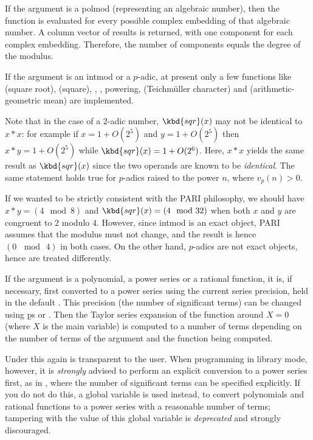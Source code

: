 \item If the argument is a polmod (representing an algebraic number),
then the function is evaluated for every possible complex embedding of that
algebraic number.  A column vector of results is returned, with one component
for each complex embedding.  Therefore, the number of components equals
the degree of the  modulus.

\item If the argument is an intmod or a $p$-adic, at present only a
few functions like  (square root),  (square), ,
, powering,  (Teichm\"uller character) and
 (arithmetic-geometric mean) are implemented.

Note that in the case of a $2$-adic number, $\kbd{sqr}(x)$ may not be
identical to $x*x$: for example if $x = 1+O(2^5)$ and $y = 1+O(2^5)$ then
$x*y = 1+O(2^5)$ while $\kbd{sqr}(x) = 1+O(2^6)$. Here, $x * x$ yields the
same result as $\kbd{sqr}(x)$ since the two operands are known to be
\emph{identical}. The same statement holds true for $p$-adics raised to the
power $n$, where $v_p(n) > 0$.

 If we wanted to be strictly consistent with
the PARI philosophy, we should have $x*y = (4 \mod 8)$ and $\kbd{sqr}(x) =
(4 \mod 32)$ when both $x$ and $y$ are congruent to $2$ modulo $4$.
However, since intmod is an exact object, PARI assumes that the modulus
must not change, and the result is hence $(0\, \mod\, 4)$ in both cases. On
the other hand, $p$-adics are not exact objects, hence are treated
differently.

\item If the argument is a polynomial, a power series or a rational function,
it is, if necessary, first converted to a power series using the current
series precision, held in the default . This precision
(the number of significant terms) can be changed using \b{ps} or
. Then the Taylor series expansion of the
function around $X=0$ (where $X$ is the main variable) is computed to a
number of terms depending on the number of terms of the argument and the
function being computed.

Under  this again is transparent to the user. When programming in
library mode, however, it is \emph{strongly} advised to perform an explicit
conversion to a power series first, as in ,
where the number of significant terms  can be specified
explicitly. If you do not do this, a global variable  is used
instead, to convert polynomials and rational functions to a power series with
a reasonable number of terms; tampering with the value of this global
variable is \emph{deprecated} and strongly discouraged.


